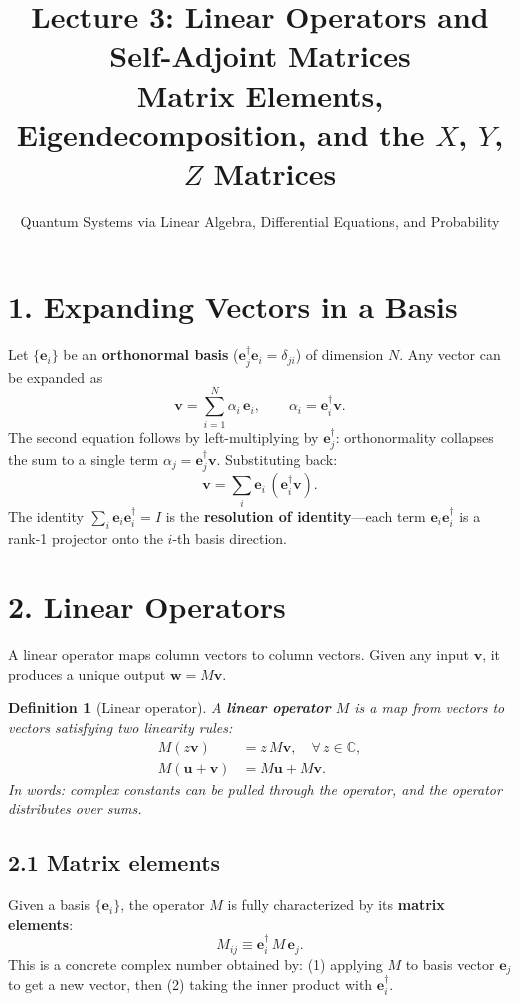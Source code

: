 \documentclass[12pt,a4paper]{article}
\title{\textbf{Lecture 3: Linear Operators and Self-Adjoint Matrices} \\ \large Matrix Elements, Eigendecomposition, and the $X$, $Y$, $Z$ Matrices}
\author{Quantum Systems via Linear Algebra, Differential Equations, and Probability}
\date{}
\newtheorem{definition}{Definition}
\begin{document}
\maketitle
\thispagestyle{fancy}

\section{1. Expanding Vectors in a Basis}

Let $\{\mathbf{e}_i\}$ be an \textbf{orthonormal basis} ($\mathbf{e}_j^\dagger\mathbf{e}_i=\delta_{ji}$) of dimension $N$.  Any vector can be expanded as
\[
    \mathbf{v} = \sum_{i=1}^{N} \alpha_i \,\mathbf{e}_i, \qquad \alpha_i = \mathbf{e}_i^\dagger\mathbf{v}.
\]
The second equation follows by left-multiplying by $\mathbf{e}_j^\dagger$: orthonormality collapses the sum to a single term $\alpha_j = \mathbf{e}_j^\dagger\mathbf{v}$.  Substituting back:
\[
    \boxed{\mathbf{v} = \sum_i \mathbf{e}_i\,(\mathbf{e}_i^\dagger\mathbf{v}).}
\]
The identity $\sum_i \mathbf{e}_i\mathbf{e}_i^\dagger = I$ is the \textbf{resolution of identity}---each term $\mathbf{e}_i\mathbf{e}_i^\dagger$ is a rank-1 projector onto the $i$-th basis direction.

\section{2. Linear Operators}

A linear operator maps column vectors to column vectors.  Given any input $\mathbf{v}$, it produces a unique output $\mathbf{w}=M\mathbf{v}$.

\begin{definition}[Linear operator]
A \textbf{linear operator} $M$ is a map from vectors to vectors satisfying two linearity rules:
\begin{align}
    M(z\mathbf{v}) &= z\,M\mathbf{v}, \quad \forall\, z\in\mathbb{C}, \\
    M(\mathbf{u}+\mathbf{v}) &= M\mathbf{u} + M\mathbf{v}.
\end{align}
In words: complex constants can be pulled through the operator, and the operator distributes over sums.
\end{definition}

\subsection{2.1 Matrix elements}
Given a basis $\{\mathbf{e}_i\}$, the operator $M$ is fully characterized by its \textbf{matrix elements}:
\[
    M_{ij} \equiv \mathbf{e}_i^\dagger\,M\,\mathbf{e}_j.
\]
This is a concrete complex number obtained by: (1) applying $M$ to basis vector $\mathbf{e}_j$ to get a new vector, then (2) taking the inner product with $\mathbf{e}_i^\dagger$.
\end{document}
